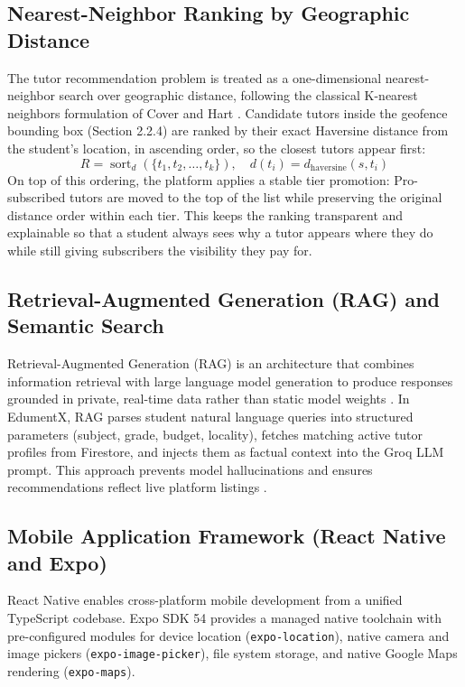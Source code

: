 \documentclass[12pt]{report}
\begin{document}
\subsection{Nearest-Neighbor Ranking by Geographic Distance}
The tutor recommendation problem is treated as a one-dimensional nearest-neighbor search over geographic distance, following the classical K-nearest neighbors formulation of Cover and Hart \cite{Cover1967KNN}. Candidate tutors inside the geofence bounding box (Section 2.2.4) are ranked by their exact Haversine distance from the student's location, in ascending order, so the closest tutors appear first:
\begin{equation}
R = \operatorname{sort}_{d}\left(\{t_1, t_2, \dots, t_k\}\right), \quad d(t_i) = d_{\text{haversine}}(s, t_i)
\end{equation}
On top of this ordering, the platform applies a stable tier promotion: Pro-subscribed tutors are moved to the top of the list while preserving the original distance order within each tier. This keeps the ranking transparent and explainable so that a student always sees why a tutor appears where they do while still giving subscribers the visibility they pay for.

\subsection{Retrieval-Augmented Generation (RAG) and Semantic Search}
Retrieval-Augmented Generation (RAG) is an architecture that combines information retrieval with large language model generation to produce responses grounded in private, real-time data rather than static model weights \cite{Lewis2021RAG}. In EdumentX, RAG parses student natural language queries into structured parameters (subject, grade, budget, locality), fetches matching active tutor profiles from Firestore, and injects them as factual context into the Groq LLM prompt. This approach prevents model hallucinations and ensures recommendations reflect live platform listings \cite{Swacha2025RAG}.

\subsection{Mobile Application Framework (React Native and Expo)}
React Native enables cross-platform mobile development from a unified TypeScript codebase. Expo SDK 54 provides a managed native toolchain with pre-configured modules for device location (\texttt{expo-location}), native camera and image pickers (\texttt{expo-image-picker}), file system storage, and native Google Maps rendering (\texttt{expo-maps}).
\end{document}
